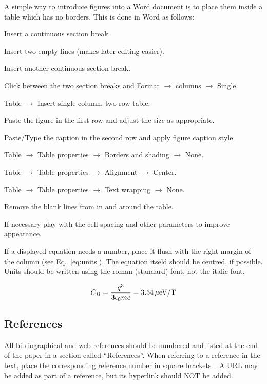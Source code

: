 \documentclass{JAC2003}
\begin{document}
A simple way to introduce figures into a Word document is to place them inside a table which has no borders. This is done in Word as follows:
\begin{Itemize}
\item	Insert a continuous section break.
\item	Insert two empty lines (makes later editing easier).
\item	Insert another continuous section break.
\item	Click between the two section breaks and Format $\rightarrow$ columns $\rightarrow$ Single.
\item	Table $\rightarrow$ Insert single column, two row table.
\item	Paste the figure in the first row and adjust the size as appropriate.
\item	Paste/Type the caption in the second row and apply figure caption style.
\item	Table $\rightarrow$ Table properties $\rightarrow$ Borders and shading $\rightarrow$ None.
\item	Table $\rightarrow$ Table properties $\rightarrow$ Alignment $\rightarrow$ Center.
\item	Table $\rightarrow$ Table properties $\rightarrow$ Text wrapping $\rightarrow$ None.
\item	Remove the blank lines from in and around the table.
\item	If necessary play with the cell spacing and other parameters to improve appearance.
\end{Itemize}

If a displayed equation needs a number, place it flush with the right
margin of the column (see Eq.~\ref{eq:units}). The equation itseld should be centred, if possible.
Units should be written
using the roman (standard) font, not the italic font.

\begin{equation}\label{eq:units}
    C_B={q^3\over 3\epsilon_{0} mc}=3.54\,\hbox{$\mu$eV/T}
\end{equation}

\subsection{References}

All bibliographical and web references should be numbered and listed at the
end of the paper in a section called ``References''. When referring to a
reference in the text, place the corresponding reference number in square
brackets~\cite{exampl-ref}. A URL may be added as part of a reference, but 
its hyperlink should NOT be added.
\end{document}
